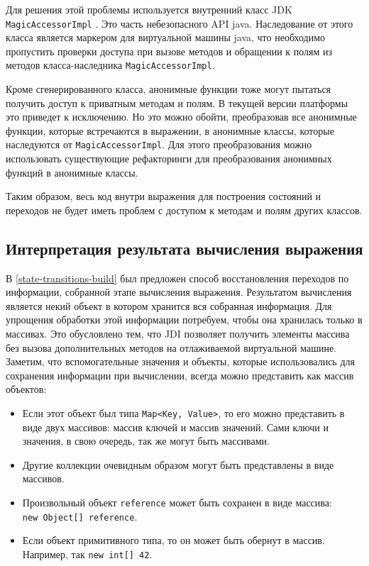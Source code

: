 Для решения этой проблемы используется внутренний класс JDK \\ \texttt{MagicAccessorImpl} \cite{magic}. Это часть небезопасного API java. Наследование от этого класса является маркером для виртуальной машины java, что необходимо пропустить проверки доступа при вызове методов и обращении к полям из методов класса-наследника \texttt{MagicAccessorImpl}.

Кроме сгенерированного класса, анонимные функции тоже могут пытаться получить доступ к приватным методам и полям. В текущей версии платформы это приведет к исключению. Но это можно обойти, преобразовав все анонимные функции, которые встречаются в выражении, в анонимные классы, которые наследуются от \texttt{MagicAccessorImpl}. Для этого преобразования можно использовать существующие рефакторинги для преобразования анонимных функций в анонимные классы.

Таким образом, весь код внутри выражения для построения состояний и переходов не будет иметь проблем с доступом к методам и полям других классов.

\subsection{Интерпретация результата вычисления выражения}  \label{impl:interpter}
В \ref{state-transitions-build} был предложен способ восстановления переходов по информации, собранной этапе вычисления выражения. Результатом вычисления является некий объект в котором хранится вся собранная информация. Для упрощения обработки этой информации потребуем, чтобы она хранилась только в массивах. Это обусловлено тем, что JDI позволяет получить элементы массива без вызова дополнительных методов на отлаживаемой виртуальной машине. Заметим, что вспомогательные значения и объекты, которые использовались для сохранения информации при вычислении, всегда можно представить как массив объектов:
\begin{itemize}
	\item Если этот объект был типа \texttt{Map<Key, Value>}, то его можно представить в виде двух массивов: массив ключей и массив значений. Сами ключи и значения, в свою очередь, так же могут быть массивами.
	\item Другие коллекции очевидным образом могут быть представлены в виде массивов.
	\item Произвольный объект \texttt{reference} может быть сохранен в виде массива: \\ \texttt{new Object[] {reference}}.
	\item Если объект примитивного типа, то он может быть обернут в массив. Например, так \texttt{new int[] {42}}.
\end{itemize}


